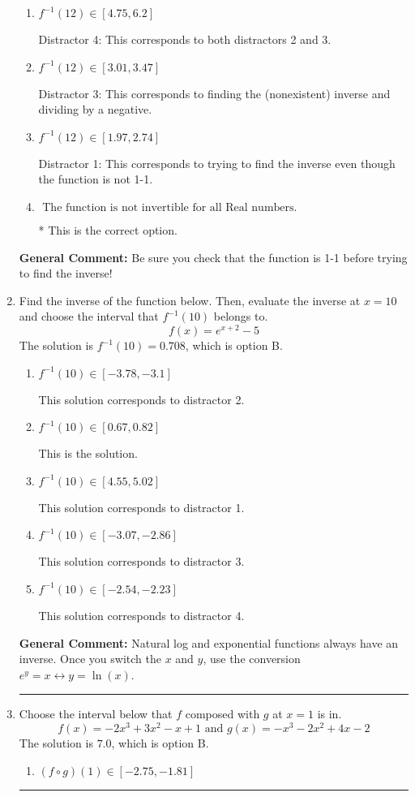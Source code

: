 \documentclass{extbook}[14pt]
\newcommand{\litem}[1]{\item #1

\rule{\textwidth}{0.4pt}}
\begin{document}
\begin{enumerate}
{\begin{enumerate}[label=\Alph*.]
 Distractor 2: This corresponds to finding the (nonexistent) inverse and not subtracting by the vertical shift.
\item \( f^{-1}(12) \in [4.75, 6.2] \)

 Distractor 4: This corresponds to both distractors 2 and 3.
\item \( f^{-1}(12) \in [3.01, 3.47] \)

 Distractor 3: This corresponds to finding the (nonexistent) inverse and dividing by a negative.
\item \( f^{-1}(12) \in [1.97, 2.74] \)

 Distractor 1: This corresponds to trying to find the inverse even though the function is not 1-1. 
\item \( \text{ The function is not invertible for all Real numbers. } \)

* This is the correct option.
\end{enumerate}

\textbf{General Comment:} Be sure you check that the function is 1-1 before trying to find the inverse!
}
\litem{
Find the inverse of the function below. Then, evaluate the inverse at $x = 10$ and choose the interval that $f^{-1}(10)$ belongs to.
\[ f(x) = e^{x+2}-5 \]The solution is \( f^{-1}(10) = 0.708 \), which is option B.\begin{enumerate}[label=\Alph*.]
\item \( f^{-1}(10) \in [-3.78, -3.1] \)

 This solution corresponds to distractor 2.
\item \( f^{-1}(10) \in [0.67, 0.82] \)

 This is the solution.
\item \( f^{-1}(10) \in [4.55, 5.02] \)

 This solution corresponds to distractor 1.
\item \( f^{-1}(10) \in [-3.07, -2.86] \)

 This solution corresponds to distractor 3.
\item \( f^{-1}(10) \in [-2.54, -2.23] \)

 This solution corresponds to distractor 4.
\end{enumerate}

\textbf{General Comment:} Natural log and exponential functions always have an inverse. Once you switch the $x$ and $y$, use the conversion $ e^y = x \leftrightarrow y=\ln(x)$.
}
\litem{
Choose the interval below that $f$ composed with $g$ at $x=1$ is in.
\[ f(x) = -2x^{3} +3 x^{2} -x + 1 \text{ and } g(x) = -x^{3} -2 x^{2} +4 x -2 \]The solution is \( 7.0 \), which is option B.\begin{enumerate}[label=\Alph*.]
\item \( (f \circ g)(1) \in [-2.75, -1.81] \)


\end{enumerate}}
\end{enumerate}
\end{document}
